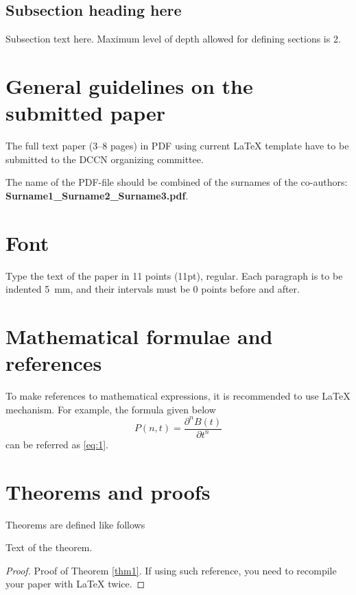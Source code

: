\documentclass[11pt]{article}
\begin{document}
\subsection{Subsection heading here}

Subsection text here. Maximum level of depth allowed for defining sections is 2.


\section{General guidelines on the submitted paper}

The full text paper (3--8 pages) in PDF using current \LaTeX{} template have to be submitted to the DCCN organizing committee.

The name of the PDF-file should be combined of the surnames of the co-authors:
\textbf{Surname1\_Surname2\_Surname3.pdf}.

\section{Font}

Type the text of the paper in 11 points (11pt), regular. Each
paragraph is to be indented 5~mm, and their intervals must be 0
points before and after.

\section{Mathematical formulae and references}

To make references to mathematical expressions, it is
recommended to use \LaTeX{} mechanism. For example, the formula
given below
\begin{equation}
\label{eq:1}
P(n,t)=\frac{\partial^n B(t)}{\partial t^n}
\end{equation}
can be referred as \eqref{eq:1}.

\section{Theorems and proofs}

Theorems are defined like follows
\begin{thm}\label{thm1}
Text of the theorem.
\end{thm}

\begin{proof}
Proof of Theorem \ref{thm1}. If using such reference, you need
to recompile your paper with \LaTeX{} twice.
\end{proof}
\end{document}

